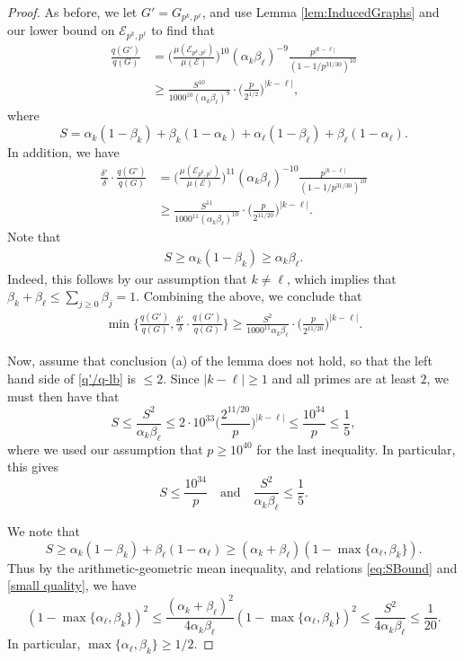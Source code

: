 \documentclass[12pt]{amsart}
\numberwithin{equation}{section}
\theoremstyle{definition}
\theoremstyle{remark}
\newcommand{\CE}{\mathcal{E}}
\newcommand{\eq}[1]{ \begin{equation} \begin{split} #1 \end{split} \end{equation} }
\newcommand{\als}[1]{\begin{align*} #1 \end{align*} }
\renewcommand{\le}{\leqslant}
\renewcommand{\ge}{\geqslant}
\begin{document}
\begin{proof}
As before, we let $G'=G_{p^k,p^\ell}$, and use Lemma \ref{lem:InducedGraphs} and our lower bound on $\CE_{p^k,p^\ell}$ to find that
\als{
	\frac{q(G')}{q(G)}
	&=\bigg(\frac{\mu(\CE_{p^k,p^\ell})}{\mu(\CE)}\bigg)^{10}
	(\alpha_k\beta_\ell)^{-9}
	\frac{p^{|k-\ell|}}{(1-1/p^{31/30})^{10}} \\
	&\ge\frac{S^{10}}{1000^{10}(\alpha_k\beta_\ell)^{9}}
		\cdot \Big(\frac{p}{2^{1/2}}\Big)^{|k-\ell|},
}
where
\[
S=\alpha_k(1-\beta_k)
+\beta_k(1-\alpha_k)
+\alpha_\ell(1-\beta_\ell)
+\beta_\ell(1-\alpha_\ell).
\]
In addition, we have
\als{
\frac{\delta'}{\delta}\cdot \frac{q(G')}{q(G)}
	&=\bigg(\frac{\mu(\CE_{p^k,p^\ell})}{\mu(\CE)}\bigg)^{11}
	(\alpha_k\beta_\ell)^{-10}
	\frac{p^{|k-\ell|}}{(1-1/p^{31/30})^{10}} \\
	&\ge\frac{S^{11}}{1000^{11}(\alpha_k\beta_\ell)^{10}}
		\cdot \Big(\frac{p}{2^{11/20}}\Big)^{|k-\ell|} .
}
Note that 
\eq{\label{S lb1}
S\ge \alpha_k(1-\beta_k)\ge \alpha_k\beta_\ell.
}
Indeed, this follows by our assumption that $k\neq\ell$, which implies that $\beta_k+\beta_\ell\le \sum_{j\ge 0}\beta_j=1$. Combining the above, we conclude that
\eq{\label{q'/q-lb}
	\min\bigg\{ \frac{q(G')}{q(G)},\frac{\delta'}{\delta}\cdot \frac{q(G')}{q(G)} \bigg\}
	\ge\frac{S^{2}}{1000^{11}\alpha_k\beta_\ell}
		\cdot \Big(\frac{p}{2^{11/20}}\Big)^{|k-\ell|}.
}

Now, assume that conclusion (a) of the lemma does not hold, so that the left hand side of \eqref{q'/q-lb} is $\le2$. Since $|k-\ell|\ge1$ and all primes are at least $2$, we must then have that
\[
S\le \frac{S^{2}}{\alpha_k\beta_\ell}
\le 2\cdot 10^{33}\bigg(\frac{2^{11/20}}{p}\bigg)^{|k-\ell|}\le\frac{10^{34}}{p}
\le\frac{1}{5},
\]
where we used our assumption that $p\ge 10^{40}$ for the last inequality. In particular, this gives
\begin{equation}\label{small quality}
S\le  \frac{10^{34}}{p}
\quad\text{and}\quad
\frac{S^2}{\alpha_k\beta_\ell}\le \frac{1}{5}.
\end{equation}

We note that
\begin{equation}
S\ge\alpha_k(1-\beta_k)+\beta_\ell(1-\alpha_\ell)\ge (\alpha_k+\beta_\ell)(1-\max\{\alpha_\ell,\beta_k\}).
\label{eq:SBound}
\end{equation}
Thus by the arithmetic-geometric mean inequality, and relations \eqref{eq:SBound} and \eqref{small quality}, we have
\[
(1-\max\{\alpha_\ell,\beta_k\})^2\le  \frac{(\alpha_k+\beta_\ell)^2}{4\alpha_k\beta_\ell}(1-\max\{\alpha_\ell,\beta_k\})^2\le \frac{S^2}{4\alpha_k\beta_\ell}\le \frac{1}{20}.
\]
In particular, $\max\{\alpha_\ell,\beta_k\}\ge 1/2$.


\end{proof}
\end{document}
